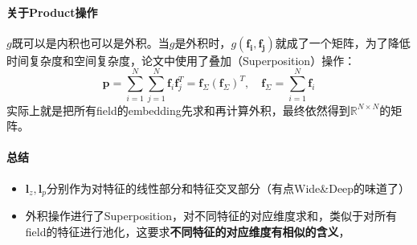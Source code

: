 \paragraph{关于Product操作}
$g$既可以是内积也可以是外积。当$g$是外积时，$g(\boldsymbol{f_i}, \boldsymbol{f_j})$就成了一个矩阵，为了降低时间复杂度和空间复杂度，论文中使用了叠加（Superposition）操作：
$$
\boldsymbol{p}=\sum_{i=1}^{N} \sum_{j=1}^{N} \boldsymbol{f}_{i} \boldsymbol{f}_{j}^{T}=\boldsymbol{f}_{\Sigma}\left(\boldsymbol{f}_{\Sigma}\right)^{T}, \quad \boldsymbol{f}_{\Sigma}=\sum_{i=1}^{N} \boldsymbol{f}_{i}
$$
实际上就是把所有field的embedding先求和再计算外积，最终依然得到$\mathbb{R}^{N \times N}$的矩阵。


\paragraph{总结}

\begin{itemize}
	\item $\boldsymbol{l}_z, \boldsymbol{l}_p$分别作为对特征的线性部分和特征交叉部分（有点Wide\&Deep的味道了）
	\item 外积操作进行了Superposition，对不同特征的对应维度求和，类似于对所有field的特征进行池化，这要求\textbf{不同特征的对应维度有相似的含义}，
	
\end{itemize}

